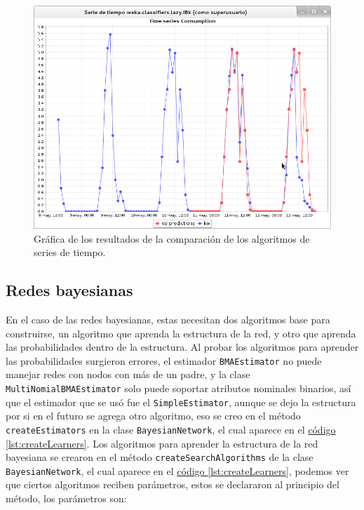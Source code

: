 \begin{figure}[ht]
	\centering
	\includegraphics[width=15cm]{img/graficaResultadosCompSeries.png}
	\caption{Gráfica de los resultados de la comparación de los algoritmos de series de tiempo.}
	\label{fig:graficaResultadosCompSeries}
\end{figure}

\subsection{Redes bayesianas} \label{subsec:compRedes}
En el caso de las redes bayesianas, estas necesitan dos algoritmos base para construirse, un algoritmo que aprenda la estructura de la red, y otro que aprenda las probabilidades dentro de la estructura. Al probar los algoritmos para aprender las probabilidades surgieron errores, el estimador \texttt{BMAEstimator} no puede manejar redes con nodos con más de un padre, y la clase \texttt{MultiNomialBMAEstimator} solo puede soportar atributos nominales binarios, así que el estimador que se usó fue el \texttt{SimpleEstimator}, aunque se dejo la estructura por si en el futuro se agrega otro algoritmo, eso se creo en el método \texttt{createEstimators} en la clase \texttt{BayesianNetwork}, el cual aparece en el 
\hyperref[lst:createLearners]{código \ref{lst:createLearners}}.
Los algoritmos para aprender la estructura de la red bayesiana se crearon en el método \texttt{createSearchAlgorithms} de la clase \texttt{BayesianNetwork}, el cual aparece en el 
\hyperref[lst:createLearners]{código \ref{lst:createLearners}}, podemos ver que ciertos algoritmos reciben parámetros, estos se declararon al principio del método, los parámetros son: 

